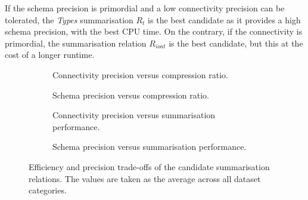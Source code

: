 If the schema precision is primordial and a low connectivity precision can be tolerated, the \emph{Types} summarisation $R_t$ is the best candidate as it provides a high schema precision, with the best CPU time. On the contrary, if the connectivity is primordial, the summarisation relation $R_{ioat}$ is the best candidate, but this at the cost of a longer runtime.

\begin{figure}
	\centering
	\begin{subfigure}[t]{0.46\textwidth}
		\resizebox{\textwidth}{!}{
			
		}
		\caption{Connectivity precision versus compression ratio.}
		\label{fig:trade-conn-volume}
	\end{subfigure}
	\qquad
	\begin{subfigure}[t]{0.46\textwidth}
		\resizebox{\textwidth}{!}{
			
		}
		\caption{Schema precision versus compression ratio.}
		\label{fig:trade-schema-volume}
	\end{subfigure}
	\qquad%
	\begin{subfigure}[t]{0.46\textwidth}
		\resizebox{\textwidth}{!}{
			
		}
		\caption{Connectivity precision versus summarisation performance.}
		\label{fig:trade-conn-cpu}
	\end{subfigure}
	\qquad%
	\begin{subfigure}[t]{0.46\textwidth}
		\resizebox{\textwidth}{!}{
			
		}
		\caption{Schema precision versus summarisation performance.}
		\label{fig:trade-schema-cpu}
	\end{subfigure}
	\caption{Efficiency and precision trade-offs of the candidate summarisation relations. The values are taken as the average across all dataset categories.}
\end{figure}
